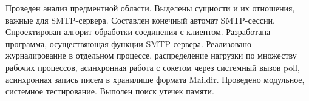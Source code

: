 \Conclusion

Проведен анализ предментной области.
Выделены сущности и их отношения, важные для SMTP-сервера.
Составлен конечный автомат SMTP-сессии.
Спроектирован алгорит обработки соединения с клиентом.
Разработана программа, осуществяющая функции SMTP-сервера.
Реализовано журналирование в отдельном процессе,
распределение нагрузки по множеству рабочих процессов,
асинхронная работа с сокетом через системный вызов poll,
асинхронная запись писем в хранилище формата Maildir.
Проведено модульное, системное тестирование.
Выполен поиск утечек памяти.
